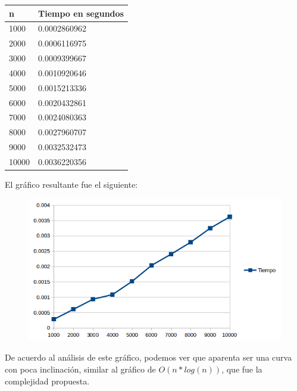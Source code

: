 \begin{table}[htb]
\centering
\begin{tabular}[c]{|l|l|}

		\hline
n & Tiempo en segundos\\
		\hline
1000	&	0.0002860962\\
		\hline
2000	&	0.0006116975\\
		\hline
3000	&	0.0009399667\\
		\hline
4000	&	0.0010920646\\
		\hline
5000	&	0.0015213336\\
		\hline
6000	&	0.0020432861\\
		\hline
7000	&	0.0024080363\\
		\hline
8000	&	0.0027960707\\
		\hline
9000	&	0.0032532473\\
		\hline
10000	&	0.0036220356\\
		\hline
		
	\end{tabular}
\end{table}

El gr\'afico resultante fue el siguiente:

 \begin{figure}[h!]
   \begin{center}
 	\includegraphics{imagenes/ej1/Mediciones/Grafico1.png}
   \end{center}
 \end{figure}

De acuerdo al an\'alisis de este gr\'afico, podemos ver que aparenta ser una curva con poca inclinaci\'on, similar al gr\'afico de $O( n*log(n) )$, que fue la complejidad propuesta.


